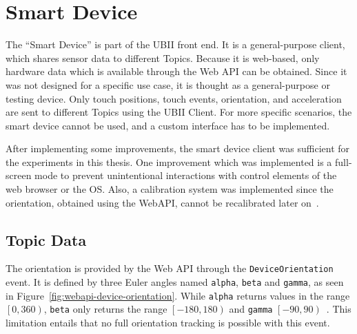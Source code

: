 \section{Smart Device}\label{section:smart-device}

The \enquote{Smart Device} is part of the \gls{UBII} front end. It is a general-purpose client, which shares sensor data to different Topics. Because it is web-based, only hardware data which is available through the Web \gls{API} can be obtained. Since it was not designed for a specific use case, it is thought as a general-purpose or testing device. Only touch positions, touch events, orientation, and acceleration are sent to different Topics using the \gls{UBII} Client. For more specific scenarios, the smart device cannot be used, and a custom interface has to be implemented.

After implementing some improvements, the smart device client was sufficient for the experiments in this thesis. One improvement which was implemented is a full-screen mode to prevent unintentional interactions with control elements of the web browser or the \gls{OS}.
Also, a calibration system was implemented since the orientation, obtained using the Web\gls{API}, cannot be recalibrated later on~\cite{DevicesandSensorsWorkingGroup.2019}. 


\subsection{Topic Data}\label{subsection:topic-data}

The orientation is provided by the Web \gls{API} through the \lstinline{DeviceOrientation} event. It is defined by three Euler angles named \lstinline{alpha}, \lstinline{beta} and \lstinline{gamma}, as seen in Figure~\ref{fig:webapi-device-orientation}.
While \lstinline{alpha} returns values in the range \(\left[0, 360\right)\), \lstinline{beta} only returns the range \(\left[-180, 180\right)\) and \lstinline{gamma} \(\left[-90, 90\right)\)~\cite[Chapter~4.1]{DevicesandSensorsWorkingGroup.2019}. %
This limitation entails that no full orientation tracking is possible with this event.

